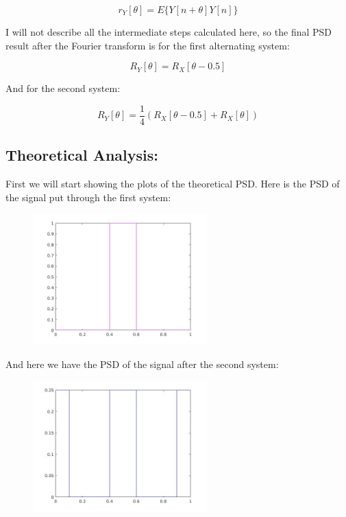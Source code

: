 \documentclass[a4paper,11pt]{article}
\begin{document}
\begin{equation}
  r_Y[\theta] = E\{Y[n+\theta]Y[n]\}
\end{equation}

I will not describe all the intermediate steps calculated here, so the final PSD result after the Fourier transform is for the first alternating system:

\begin{equation}
  R_Y[\theta] = R_X[\theta-0.5]
\end{equation}

And for the second system:

\begin{equation}
  R_Y[\theta] = \frac{1}{4}(R_X[\theta-0.5] + R_X[\theta])
\end{equation}

\newpage

\subsection{Theoretical Analysis:}

First we will start showing the plots of the theoretical PSD. Here is the PSD of the signal put through the first system:

\begin{figure}[!hp]
    \begin{center}
    \includegraphics[width=0.6\textwidth]{images/lab4_8.jpg}
    \end{center}
\end{figure}

And here we have the PSD of the signal after the second system:

\begin{figure}[!hp]
    \begin{center}
      \includegraphics[width=0.6\textwidth]{images/lab4_9.jpg}
    \end{center}
\end{figure}
\end{document}
